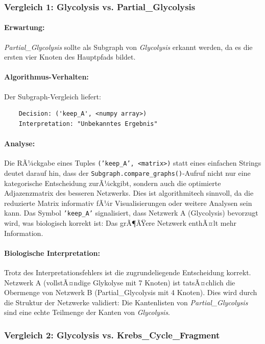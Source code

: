 ﻿\documentclass[a4paper,12pt]{article}
\theoremstyle{definition}
\begin{document}
\subsubsection{Vergleich 1: Glycolysis vs. Partial\_Glycolysis}

\paragraph{Erwartung:}
\textit{Partial\_Glycolysis} sollte als Subgraph von \textit{Glycolysis} erkannt werden, da es die ersten vier Knoten des Hauptpfads bildet.

\paragraph{Algorithmus-Verhalten:}
Der Subgraph-Vergleich liefert:
\begin{verbatim}
	Decision: ('keep_A', <numpy array>)
	Interpretation: "Unbekanntes Ergebnis"
\end{verbatim}

\paragraph{Analyse:}
Die RÃ¼ckgabe eines Tuples \texttt{('keep\_A', <matrix>)} statt eines einfachen Strings deutet darauf hin, dass der \texttt{Subgraph.compare\_graphs()}-Aufruf nicht nur eine kategorische Entscheidung zurÃ¼ckgibt, sondern auch die optimierte Adjazenzmatrix des besseren Netzwerks. Dies ist algorithmitech sinnvoll, da die reduzierte Matrix informativ fÃ¼r Visualisierungen oder weitere Analysen sein kann. Das Symbol \texttt{'keep\_A'} signalisiert, dass Netzwerk A (Glycolysis) bevorzugt wird, was biologisch korrekt ist: Das grÃ¶ÃŸere Netzwerk enthÃ¤lt mehr Information.

\paragraph{Biologische Interpretation:}
Trotz des Interpretationsfehlers ist die zugrundeliegende Entscheidung korrekt. Netzwerk A (vollstÃ¤ndige Glykolyse mit 7 Knoten) ist tatsÃ¤chlich die Obermenge von Netzwerk B (Partial\_Glycolysis mit 4 Knoten). Dies wird durch die Struktur der Netzwerke validiert: Die Kantenlisten von \textit{Partial\_Glycolysis} sind eine echte Teilmenge der Kanten von \textit{Glycolysis}.

\subsubsection{Vergleich 2: Glycolysis vs. Krebs\_Cycle\_Fragment}
\end{document}
